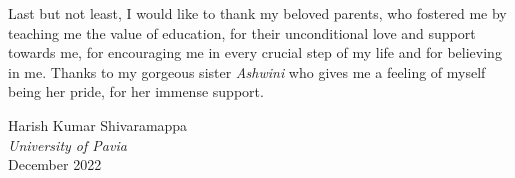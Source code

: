 Last but not least, I would like to thank my beloved parents, who fostered me by teaching me the value of education, for their unconditional love and support towards me, for encouraging me in every crucial step of my life and for believing in me. Thanks to my gorgeous sister \textit{Ashwini} who gives me a feeling of myself being her pride, for her immense support.


\begin{flushright}
    Harish Kumar Shivaramappa\\
    \textit{University of Pavia}\\
    December 2022
\end{flushright}


